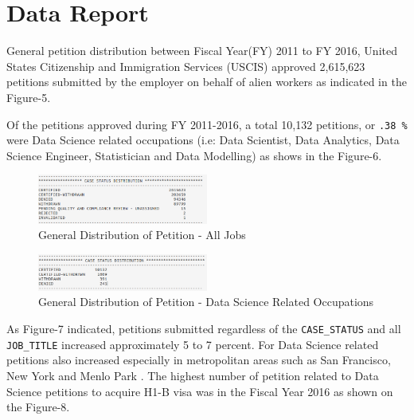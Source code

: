 \documentclass[9pt,twocolumn,twoside]{styles/osajnl}
\begin{document}
\section{ Data Report}

General  petition distribution between Fiscal Year(FY) 2011 to FY 2016, United States Citizenship and Immigration Services (USCIS) approved 2,615,623 petitions submitted  by the employer on behalf of alien workers as indicated in the Figure-5.  

Of the petitions approved during FY 2011-2016, a total 10,132 petitions, or \verb|.38 %|  were  Data Science related occupations (i.e:  Data Scientist, Data Analytics, Data Science Engineer, Statistician and Data Modelling) as shows in the Figure-6. 

\begin{figure}[H]
  \centering
  \includegraphics[width=0.5\textwidth]{images/image14} 
  \caption{General Distribution of Petition  - All Jobs}
  \end{figure}

\begin{figure}[H]
  \centering
  \includegraphics[width=0.5\textwidth]{images/image17}     
  \caption{General Distribution of Petition  - Data Science Related Occupations}
  \end{figure}


As Figure-7 indicated, petitions submitted regardless of the \verb|CASE_STATUS| and all \verb|JOB_TITLE| increased approximately 5 to 7 percent. For Data Science related petitions also increased especially in metropolitan areas such as San Francisco, New York and Menlo Park . The highest number of petition related to Data Science petitions to acquire H1-B visa was in the Fiscal Year 2016 as shown on the Figure-8.
\end{document}
